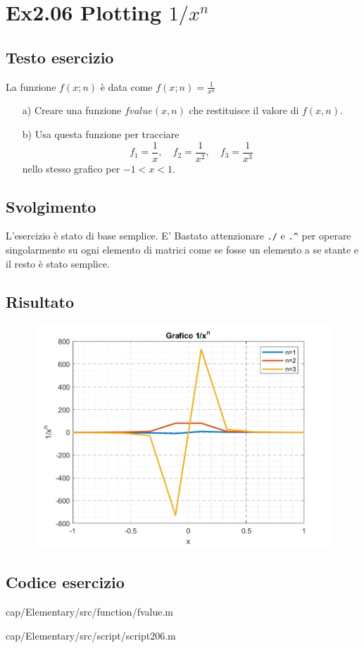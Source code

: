 \section{Ex2.06 Plotting $1/x^n$}\label{1/x^n}
\subsection{Testo esercizio}
La funzione $f(x;n)$ è data come $f(x;n) =\frac{1}{x^{n}}$

\begin{itemize}
    \item[a)] Creare una funzione $fvalue(x,n)$ che restituisce il valore di $f(x,n)$.
        
    \item[b)] Usa questa funzione per tracciare $$f_1=\dfrac{1}{x},\quad 
    f_2=\dfrac{1}{x^2}, \quad f_3=\dfrac{1}{x^3}$$ nello stesso grafico per $-1<x<1$.
\end{itemize}

\subsection{Svolgimento}
L'esercizio è stato di base semplice. E' Bastato attenzionare \verb*|./| e \verb*|.^| per 
operare singolarmente su ogni elemento di matrici come se fosse un elemento a se stante e 
il resto è stato semplice.

\subsection{Risultato}
\begin{figure}[h]
    \centering
    \includegraphics{cap/Elementary/img/script206}
    \label{fig:script206}
\end{figure}
\newpage

\subsection{Codice esercizio}

{cap/Elementary/src/function/fvalue.m}


{cap/Elementary/src/script/script206.m}
